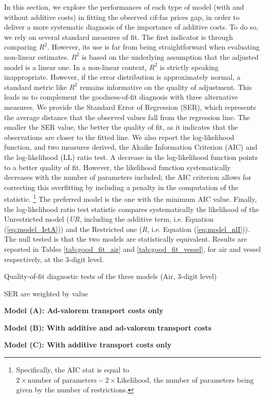 \documentclass[a4paper,11pt]{article}
\begin{document}
In this section, we explore the performances of each type of model (with and without additive costs) in fitting the observed cif-fas prices gap, in order to deliver a more systematic diagnosis of the importance of additive costs.
To do so, we rely on several standard measures of fit.
The first indicator is through comparing $R^{2}$.
However, its use is far from being straightforward when evaluating non-linear estimates.
$R^2$ is based on the underlying assumption that the adjusted model is a linear one.
In a non-linear context, $R^2$ is strictly speaking inappropriate.
However, if the error distribution is approximately normal, a standard metric like $R^2$ remains informative on the quality of adjustment.
This leads us to complement the goodness-of-fit diagnosis with three alternative measures.
We provide the Standard Error of Regression (SER), which represents the average distance that the observed values fall from the regression line.
The smaller the SER value, the better the quality of fit, as it indicates that the observations are closer to the fitted line.
We also report the log-likelihood function, and two measures derived, the Akaike Information Criterion (AIC) and the log-likelihood (LL) ratio test.
A decrease in the log-likelihood function points to a better quality of fit.
However, the likelihood function systematically decreases with the number of parameters included; the AIC criterion allows for correcting this overfitting by including a penalty in the computation of the statistic. \footnote{Specifically, the AIC stat is equal to $2 \times \textrm{number of parameters} - 2 \times \textrm{Likelihood} $, the number of parameters being given by the number of restrictions.}
The preferred model is the one with the minimum AIC value.
Finally, the log-likelihood ratio test statistic compares systematically the likelihood of the Unrestricted model (\emph{UR}, including the additive term, i.e.
Equation (\ref{eq:model_IetA})) and the Restricted one (\emph{R}, i.e.
Equation (\ref{eq:model_nlI})).
The null tested is that the two models are statistically equivalent.
Results are reported in Tables \ref{tab:good_fit_air} and \ref{tab:good_fit_vessel}, for air and vessel respectively, at the 3-digit level.

\begin{table}[htbp]
\centering
\footnotesize{
	\caption{Quality-of-fit diagnostic tests of the three models (Air, 3-digit level)}\vspace{5mm}
	\label{tab:good_fit_air}%
	
\begin{tablenotes}
	\tiny
	\item SER are weighted by value
	\item \textbf{Model (A): Ad-valorem transport costs only}
	\item \textbf{Model (B): With additive and ad-valorem transport costs}
	\item \textbf{Model (C): With additive transport costs only}
\end{tablenotes}
}
\end{table}%
\end{document}
